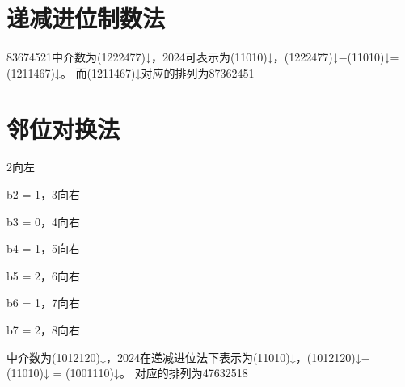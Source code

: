 \documentclass{article}
\begin{document}
\begin{CJK}{UTF8}{gbsn}
\section*{递减进位制数法}
83674521中介数为(1222477)↓，2024可表示为(11010)↓，(1222477)↓−(11010)↓= (1211467)↓。
而(1211467)↓对应的排列为87362451
\section*{邻位对换法}
2向左

b2 = 1，3向右

b3 = 0，4向右

b4 = 1，5向右

b5 = 2，6向右

b6 = 1，7向右

b7 = 2，8向右

中介数为(1012120)↓，2024在递减进位法下表示为(11010)↓，(1012120)↓−
(11010)↓ = (1001110)↓。
对应的排列为47632518
\end{CJK}
\end{document}

